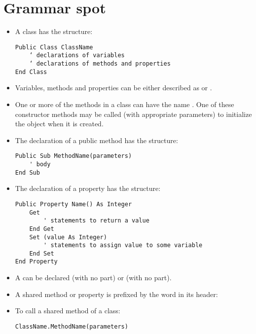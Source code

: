 	\section{Grammar spot}
		\begin{itemize}
      \item A class has the structure:
				\begin{lstlisting}
Public Class ClassName
	‘ declarations of variables
	‘ declarations of methods and properties
End Class
				\end{lstlisting}
      \item Variables, methods and properties can be either described as  or .
      \item One or more of the methods in a class can have the name . One of these constructor methods may be called (with appropriate parameters) to initialize the object when it is created.
      \item The declaration of a public method has the structure:
				\begin{lstlisting}
Public Sub MethodName(parameters)
	' body
End Sub
				\end{lstlisting}
      \item The declaration of a property has the structure:
				\begin{lstlisting}
Public Property Name() As Integer
	Get
		' statements to return a value
	End Get
	Set (value As Integer)
		' statements to assign value to some variable
	End Set
End Property
				\end{lstlisting}
			\item A  can be declared  (with no  part) or  (with no  part).
			\item A shared method or property is prefixed by the word  in its header:
      \item To call a shared method of a class:
				\begin{lstlisting}
ClassName.MethodName(parameters)
				\end{lstlisting}
		\end{itemize}


